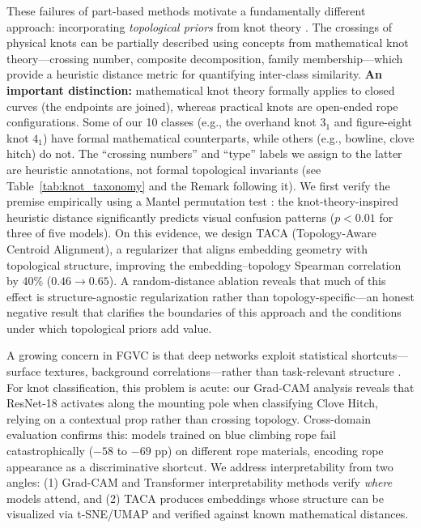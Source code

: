 \documentclass[preprint,review,12pt]{elsarticle}
\begin{document}
These failures of part-based methods motivate a fundamentally different approach: incorporating \emph{topological priors} from knot theory \citep{adams2004}. The crossings of physical knots can be partially described using concepts from mathematical knot theory---crossing number, composite decomposition, family membership---which provide a heuristic distance metric for quantifying inter-class similarity. \textbf{An important distinction:} mathematical knot theory formally applies to closed curves (the endpoints are joined), whereas practical knots are open-ended rope configurations. Some of our 10 classes (e.g., the overhand knot $3_1$ and figure-eight knot $4_1$) have formal mathematical counterparts, while others (e.g., bowline, clove hitch) do not. The ``crossing numbers'' and ``type'' labels we assign to the latter are heuristic annotations, not formal topological invariants (see Table~\ref{tab:knot_taxonomy} and the Remark following it). We first verify the premise empirically using a Mantel permutation test \citep{mantel1967}: the knot-theory-inspired heuristic distance significantly predicts visual confusion patterns ($p < 0.01$ for three of five models). On this evidence, we design TACA (Topology-Aware Centroid Alignment), a regularizer that aligns embedding geometry with topological structure, improving the embedding--topology Spearman correlation by 40\% ($0.46 \to 0.65$). A random-distance ablation reveals that much of this effect is structure-agnostic regularization rather than topology-specific---an honest negative result that clarifies the boundaries of this approach and the conditions under which topological priors add value.

A growing concern in FGVC is that deep networks exploit statistical shortcuts---surface textures, background correlations---rather than task-relevant structure \citep{geirhos2020shortcut, geirhos2019imagenettrained, rudin2019stop}. For knot classification, this problem is acute: our Grad-CAM analysis \citep{selvaraju2017gradcam} reveals that ResNet-18 activates along the mounting pole when classifying Clove Hitch, relying on a contextual prop rather than crossing topology. Cross-domain evaluation confirms this: models trained on blue climbing rope fail catastrophically ($-58$ to $-69$ pp) on different rope materials, encoding rope appearance as a discriminative shortcut. We address interpretability from two angles: (1) Grad-CAM and Transformer interpretability methods \citep{chefer2021transformer} verify \emph{where} models attend, and (2) TACA produces embeddings whose structure can be visualized via t-SNE/UMAP and verified against known mathematical distances.
\end{document}
